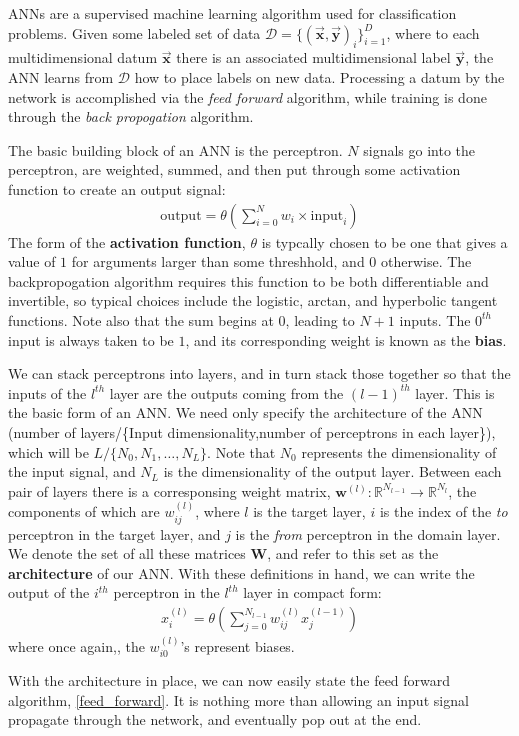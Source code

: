 \documentclass[prl,amsmath,amssymb,floatfix,superscriptaddress,notitlepage,twocolumn]{revtex4}
\newcommand{\ee}[1]{\begin{align} #1 \end{align}} 						%
\newcommand{\vc}[1]{\vec{\mathbf{#1}}} 								%
\begin{document}
ANNs are a supervised machine learning algorithm used for classification problems. Given some labeled set of data $\mathcal{D}=\{(\vc x,\vc y)_i\}_{i=1}^D$, where to each multidimensional datum $\vc x$ there is an associated multidimensional label $\vc y$, the ANN learns from $\mathcal{D}$ how to place labels on new data. Processing a datum by the network is accomplished via the \textit{feed forward} algorithm, while training is done through the \textit{back propogation} algorithm. 

The basic building block of an ANN is the perceptron. $N$ signals go into the perceptron, are weighted, summed, and then put through some activation function to create an output signal:
\ee{
\label{perceptron}
\text{output}=\theta(\sum_{i=0}^{N}w_i\times\text{input}_i)
}
The form of the \textbf{activation function}, $\theta$ is typcally chosen to be one that gives a value of $1$ for arguments larger than some threshhold, and $0$ otherwise. The backpropogation algorithm requires this function to be both differentiable and invertible, so typical choices include the logistic, arctan, and hyperbolic tangent functions. Note also that the sum begins at $0$, leading to $N+1$ inputs. The $0^{th}$ input is always taken to be $1$, and its corresponding weight is known as the \textbf{bias}.

We can stack perceptrons into layers, and in turn stack those together so that the inputs of the $l^{th}$ layer are the outputs coming from the $(l-1)^{th}$ layer. This is the basic form of an ANN. We need only specify the architecture of the ANN (number of layers/\{Input dimensionality,number of perceptrons in each layer\}), which will be $L/\{N_0,N_1,\dots,N_L\}$. Note that $N_0$ represents the dimensionality of the input signal, and $N_L$ is the dimensionality of the output layer. Between each pair of layers there is a corresponsing weight matrix, $\textbf{w}^{(l)}:\mathbb{R}^{N_{l-1}}\rightarrow\mathbb{R}^{N_l}$, the components of which are $w_{ij}^{(l)}$, where $l$ is the target layer, $i$ is the index of the \textit{to} perceptron in the target layer, and $j$ is the \textit{from} perceptron in the domain layer. We denote the set of all these matrices \textbf{W}, and refer to this set as the \textbf{architecture} of our ANN. With these definitions in hand, we can write the output of the $i^{th}$ perceptron in the $l^{th}$ layer in compact form:
\ee{
x^{(l)}_i=\theta(\sum_{j=0}^{N_{l-1}}w^{(l)}_{ij}x^{(l-1)}_j)
}
where once again,, the $w^{(l)}_{i0}$'s represent biases. 

With the architecture in place, we can now easily state the feed forward algorithm, \ref{feed_forward}. It is nothing more than allowing an input signal propagate through the network, and eventually pop out at the end.
\end{document}
